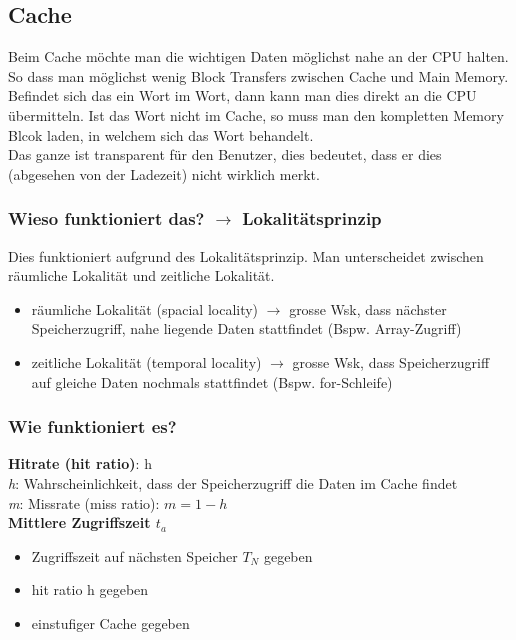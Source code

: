 \documentclass{report}
\theoremstyle{definition}
\theoremstyle{example}
\begin{document}
	\subsection{Cache}
Beim Cache möchte man die wichtigen Daten möglichst nahe an der CPU halten. So dass man möglichst wenig Block Transfers zwischen Cache und Main Memory. Befindet sich das ein Wort im Wort, dann kann man dies direkt an die CPU übermitteln. Ist das Wort nicht im Cache, so muss man den kompletten Memory Blcok laden, in welchem sich das Wort behandelt.\\
Das ganze ist transparent für den Benutzer, dies bedeutet, dass er dies (abgesehen von der Ladezeit) nicht wirklich merkt.\\

		\subsubsection{Wieso funktioniert das? $\rightarrow$ Lokalitätsprinzip}
Dies funktioniert aufgrund des Lokalitätsprinzip. Man unterscheidet zwischen räumliche Lokalität und zeitliche Lokalität. \\
\begin{itemize}
	\item räumliche Lokalität (spacial locality) $\rightarrow$ grosse Wsk, dass nächster Speicherzugriff, nahe liegende Daten stattfindet (Bspw. Array-Zugriff)
	\item zeitliche Lokalität (temporal locality) $\rightarrow$ grosse Wsk, dass Speicherzugriff auf gleiche Daten nochmals stattfindet (Bspw. for-Schleife)
\end{itemize}

		\subsubsection{Wie funktioniert es?}
\textbf{Hitrate (hit ratio)}: h\\
\textit{h}: Wahrscheinlichkeit, dass der Speicherzugriff die Daten im Cache findet\\

\textit{m}: Missrate (miss ratio): $m=1-h$\\

\textbf{Mittlere Zugriffszeit $t_a$}\\
\begin{itemize}
	\item Zugriffszeit auf nächsten Speicher $T_N$ gegeben
	\item hit ratio h gegeben
	\item einstufiger Cache gegeben
\end{itemize}
\end{document}
